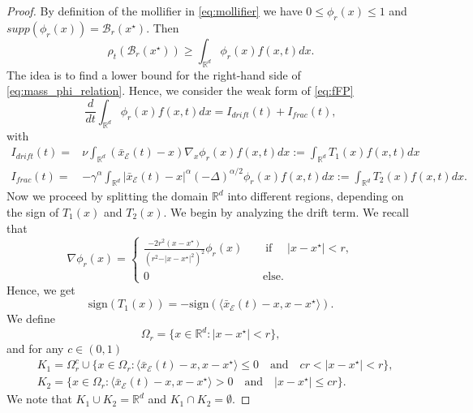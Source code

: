 \documentclass[11pt,handout]{article}%
\numberwithin{equation}{section}
\theoremstyle{definition}
\def\RR{\mathbb R}
\begin{document}
\begin{proof}
	By definition of the mollifier in \eqref{eq:mollifier} we have $0\leq \phi_r(x)\leq 1$ and $supp (\phi_r(x)) = \mathcal{B}_r(x^\star)$. Then 
	\begin{equation}\label{eq:mass_phi_relation}
		\rho_t(\mathcal{B}_r(x^\star)) \geq \int_{\RR^d} \phi_r(x) f(x,t) dx. 
	\end{equation}
	The idea is to find a lower bound for the right-hand side of \eqref{eq:mass_phi_relation}. Hence, we consider the weak form of \eqref{eq:fFP}
	\begin{equation*}
		\frac{d}{dt} \int_{\RR^d} \phi_r(x) f(x,t) dx = I_{drift}(t) + I_{frac}(t),
	\end{equation*}
	with
	\begin{equation*}
		\begin{split}
			I_{drift}(t) = & \nu \int_{\RR^d}  (\bar{x}_\mathcal{E}(t)-x) \nabla_x \phi_r(x) f(x,t) dx := \int_{\RR^d} T_1(x) f(x,t) dx \\
			I_{frac}(t) = & -\gamma^\alpha \int_{\RR^d} \vert \bar{x}_\mathcal{E}(t)-x\vert^\alpha (-\Delta)^{\alpha/2} \phi_r(x) f(x,t) dx := \int_{\RR^d} T_2(x) f(x,t) dx.
		\end{split}
	\end{equation*}
	Now we proceed by splitting the domain $\RR^d$ into different regions, depending on the sign of $T_1(x)$ and $T_2(x)$. 
	We begin by analyzing the drift term. We recall that 
	\begin{equation*}
		\nabla \phi_r(x) = \begin{cases}
			\frac{-2 r^2 (x-x^\star) }{(r^2 - \vert x-x^\star\vert^2)^2} \phi_r(x)  \qquad \text{if } \quad \vert x-x^\star \vert < r,\\
			0  \qquad  \qquad \qquad \qquad \qquad  \text{else}.
		\end{cases}
	\end{equation*}
	Hence, we get
	\begin{equation*}
		\text{sign}(T_1(x)) = - \text{sign}( \langle \bar{x}_\mathcal{E}(t)-x, x-x^\star\rangle). 
	\end{equation*}
	We define 
	\begin{equation*}
		\Omega_r = \{ x\in \RR^d : \vert x-x^\star\vert < r\},
	\end{equation*}
	and for any $c\in (0,1)$
	\begin{equation}
		\begin{split}
			& K_1 = \Omega_r^c \cup \{ x\in \Omega_r : \langle \bar{x}_\mathcal{E}(t)-x, x-x^\star\rangle \leq 0 \quad \text{and} \quad c r<\vert x-x^\star \vert < r \},\\
			& K_2 = \{ x\in \Omega_r : \langle \bar{x}_\mathcal{E}(t)-x, x-x^\star\rangle > 0 \quad \text{and} \quad \vert x-x^\star \vert \leq c r\}.
		\end{split}
	\end{equation}
	We note that $K_1 \cup K_2 = \RR^d$ and $K_1\cap K_2 = \emptyset$. 

\end{proof}
\end{document}
